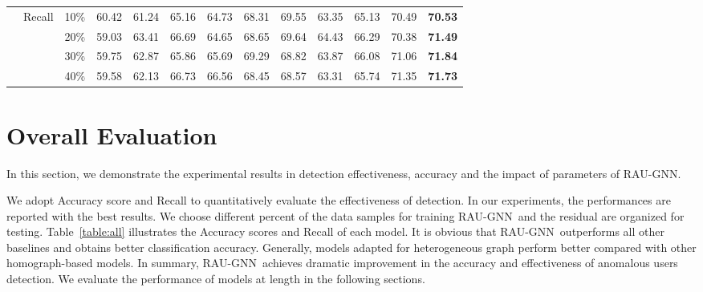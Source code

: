 \documentclass[conference]{IEEEtran}
\theoremstyle{definition}
\newcommand{\model}{\textsc{RAU-GNN}}
\begin{document}
\begin{table}[htbp]
\begin{tabular}{|cccccccccc|ccc|}
\multicolumn{1}{|c|}{}                                  & \multicolumn{1}{c|}{\multirow{4}{*}{Recall}}   & \multicolumn{1}{c|}{10\%} & 60.42        & 61.24        & 65.16        & 64.73                                                          & 68.31           & 69.55        & 63.35             & 65.13           & 70.49           & \textbf{70.53}   \\
\multicolumn{1}{|c|}{}                                  & \multicolumn{1}{c|}{}                          & \multicolumn{1}{c|}{20\%} & 59.03        & 63.41        & 66.69        & 64.65                                                          & 68.65           & 69.64        & 64.43             & 66.29           & 70.38           & \textbf{71.49}   \\
\multicolumn{1}{|c|}{}                                  & \multicolumn{1}{c|}{}                          & \multicolumn{1}{c|}{30\%} & 59.75        & 62.87        & 65.86        & 65.69                                                          & 69.29           & 68.82        & 63.87             & 66.08           & 71.06           & \textbf{71.84}   \\
\multicolumn{1}{|c|}{}                                  & \multicolumn{1}{c|}{}                          & \multicolumn{1}{c|}{40\%} & 59.58        & 62.13        & 66.73        & 66.56                                                          & 68.45           & 68.57        & 63.31             & 65.74           & 71.35           & \textbf{71.73}   \\ \bottomrule
\end{tabular}
\end{table}

\section{Overall Evaluation}

In this section, we demonstrate the experimental results in detection effectiveness, accuracy and the impact of parameters of \model.

We adopt Accuracy score and Recall to quantitatively evaluate the effectiveness of detection. In our experiments, the performances are reported with the best results.
We choose different percent of the data samples for training \model~and the residual are organized for testing. Table~\ref{table:all} illustrates the Accuracy scores and Recall of each model. It is obvious that \model~outperforms all other baselines and obtains better classification accuracy. Generally,  models adapted for heterogeneous graph perform better compared with other homograph-based models. 
In summary, \model~achieves dramatic improvement in the accuracy and effectiveness of anomalous users detection.
We evaluate the performance of models at length in the following sections.
\end{document}
